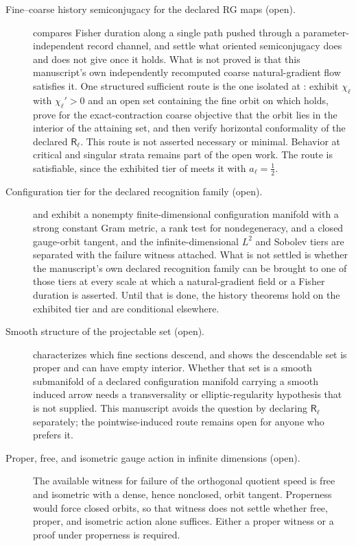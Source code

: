 \begin{description}
\item[Fine--coarse history semiconjugacy for the declared RG maps (open).]
 compares Fisher duration along a
single path pushed through a parameter-independent record channel, and
settle what oriented semiconjugacy does and does not give once it holds.  What
is not proved is that this manuscript's own independently recomputed coarse
natural-gradient flow satisfies it.  One structured sufficient route is the
one isolated at : exhibit
\(\chi_\ell\) with \(\chi_\ell'>0\) and an open set containing the fine orbit on
which  holds, prove for the
exact-contraction coarse objective that the orbit lies in the interior of the
attaining set, and then verify horizontal conformality of the declared
\(\mathsf R_\ell\).  This route is not asserted necessary or minimal.  Behavior
at critical and singular strata remains part of the open work.  The route is
satisfiable, since the exhibited tier of
 meets it with
\(a_\ell=\tfrac12\). 

\item[Configuration tier for the declared recognition family (open).]
 and
 exhibit a nonempty finite-dimensional
configuration manifold with a strong constant Gram metric, a rank test for
nondegeneracy, and a closed gauge-orbit tangent, and the infinite-dimensional
\(L^2\) and Sobolev tiers are separated with the failure witness attached.
What is not settled is whether the manuscript's own declared recognition family
can be brought to one of those tiers at every scale at which a natural-gradient
field or a Fisher duration is asserted.  Until that is done, the history
theorems hold on the exhibited tier and are conditional elsewhere.

\item[Smooth structure of the projectable set (open).]
 characterizes which fine sections descend, and
 shows the descendable set is proper and can
have empty interior.  Whether that set is a smooth submanifold of a declared
configuration manifold carrying a smooth induced arrow needs a transversality
or elliptic-regularity hypothesis that is not supplied.  This manuscript avoids
the question by declaring \(\mathsf R_\ell\) separately; the pointwise-induced
route remains open for anyone who prefers it. 

\item[Proper, free, and isometric gauge action in infinite dimensions (open).]
The available witness for failure of the orthogonal quotient speed is free and
isometric with a dense, hence nonclosed, orbit tangent.  Properness would force
closed orbits, so that witness does not settle whether free, proper, and
isometric action alone suffices.  Either a proper witness or a proof under
properness is required. 
\end{description}

